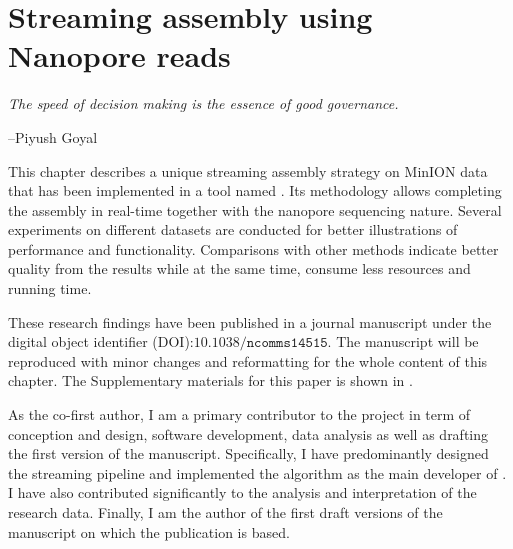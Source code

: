 \chapter{Streaming assembly using Nanopore reads}\label{ch:npscarf}
\thispagestyle{empty}
\vspace*{\fill}
\epigraph{\emph{The speed of decision making is the essence of good governance.}}
{--Piyush Goyal}

\clearpage
This chapter describes a unique streaming assembly strategy on MinION data that has been implemented in a tool named \npscarf{}. Its methodology allows completing the assembly in real-time together with the nanopore sequencing nature. Several experiments on different datasets are conducted for better illustrations of \npscarf{} performance and functionality. 
Comparisons with other methods indicate better quality from the results while at the same time, consume less resources and running time.

These research findings have been published in a journal manuscript under the digital object identifier (DOI):$\mathtt{10.1038/ncomms14515}$. The manuscript will be reproduced with minor changes and reformatting for the whole content of this chapter.
The Supplementary materials for this paper is shown in .

As the co-first author, I am a primary contributor to the project in term of conception and design, software development, data analysis as well as drafting the first version of the manuscript. 
Specifically, I have predominantly designed the streaming pipeline and implemented the algorithm as the main developer of \npscarf{}. 
I have also contributed significantly to the analysis and interpretation of the research data. 
Finally, I am the author of the first draft versions of the manuscript on which the publication is based.

